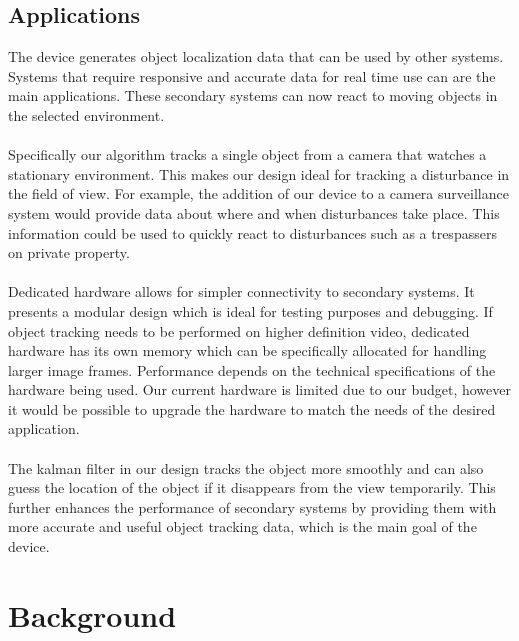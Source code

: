 \documentclass[12pt]{article} %
\begin{document}
\subsection{Applications}
The device generates object localization data that can be used by other systems. Systems that require responsive and accurate data for real time use can are the main applications. These secondary systems can now react to moving objects in the selected environment. \\\\
Specifically our algorithm tracks a single object from a camera that watches a stationary environment. This makes our design ideal for tracking a disturbance in the field of view. For example, the addition of our device to a camera surveillance system would provide data about where and when disturbances take place. This information could be used to quickly react to disturbances such as a trespassers on private property.\\\\
Dedicated hardware allows for simpler connectivity to secondary systems. It presents a modular design which is ideal for testing purposes and debugging. If object tracking needs to be performed on higher definition video, dedicated hardware has its own memory which can be specifically allocated for handling larger image frames. Performance depends on the technical specifications of the hardware being used. Our current hardware is limited due to our budget, however it would be possible to upgrade the hardware to match the needs of the desired application. \\\\
The kalman filter in our design tracks the object more smoothly and can also guess the location of the object if it disappears from the view temporarily. This further enhances the performance of secondary systems by providing them with more accurate and useful object tracking data, which is the main goal of the device.
\section{Background}
\end{document}
